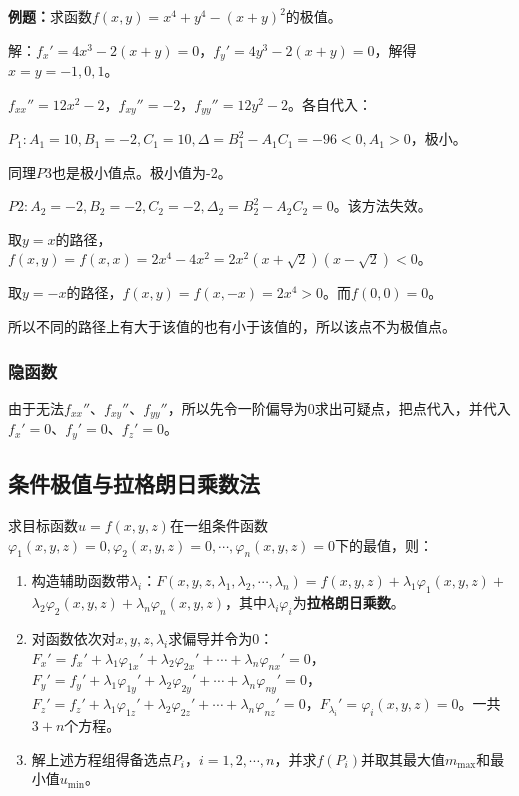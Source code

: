 \documentclass[UTF8, 12pt]{ctexart}
\begin{document}
        \textbf{例题：}求函数$f(x,y)=x^4+y^4-(x+y)^2$的极值。

        解：$f_x'=4x^3-2(x+y)=0$，$f_y'=4y^3-2(x+y)=0$，解得$x=y=-1,0,1$。

        $f_{xx}''=12x^2-2$，$f_{xy}''=-2$，$f_{yy}''=12y^2-2$。各自代入：

        $P_1:A_1=10,B_1=-2,C_1=10,\Delta=B_1^2-A_1C_1=-96<0,A_1>0$，极小。

        同理$P3$也是极小值点。极小值为-2。

        $P2:A_2=-2,B_2=-2,C_2=-2,\Delta_2=B_2^2-A_2C_2=0$。该方法失效。

        取$y=x$的路径，$f(x,y)=f(x,x)=2x^4-4x^2=2x^2(x+\sqrt{2})(x-\sqrt{2})<0$。

        取$y=-x$的路径，$f(x,y)=f(x,-x)=2x^4>0$。而$f(0,0)=0$。

        所以不同的路径上有大于该值的也有小于该值的，所以该点不为极值点。

        \subsubsection{隐函数}

        由于无法$f_{xx}''$、$f_{xy}''$、$f_{yy}''$，所以先令一阶偏导为0求出可疑点，把点代入，并代入$f_x'=0$、$f_y'=0$、$f_z'=0$。

        \subsection{条件极值与拉格朗日乘数法}

        求目标函数$u=f(x,y,z)$在一组条件函数$\varphi_1(x,y,z)=0,\varphi_2(x,y,z)=0,\cdots,\varphi_n(x,y,z)=0$下的最值，则：

        \begin{enumerate}
            \item 构造辅助函数带$\lambda_i$：$F(x,y,z,\lambda_1,\lambda_2,\cdots,\lambda_n)=f(x,y,z)+\lambda_1\varphi_1(x,y,z)+$\\$\lambda_2\varphi_2(x,y,z)+\lambda_n\varphi_n(x,y,z)$，其中$\lambda_i\varphi_i$为\textbf{拉格朗日乘数}。
            \item 对函数依次对$x,y,z,\lambda_i$求偏导并令为0：$F_x'=f_x'+\lambda_1\varphi_{1x}'+\lambda_2\varphi_{2x}'+\cdots+\lambda_n\varphi_{nx}'=0$，$F_y'=f_y'+\lambda_1\varphi_{1y}'+\lambda_2\varphi_{2y}'+\cdots+\lambda_n\varphi_{ny}'=0$，$F_z'=f_z'+\lambda_1\varphi_{1z}'+\lambda_2\varphi_{2z}'+\cdots+\lambda_n\varphi_{nz}'=0$，$F_{\lambda_i}'=\varphi_i(x,y,z)=0$。一共$3+n$个方程。
            \item 解上述方程组得备选点$P_i$，$i=1,2,\cdots,n$，并求$f(P_i)$并取其最大值$m_{\max}$和最小值$u_{\min}$。
        \end{enumerate}
\end{document}
